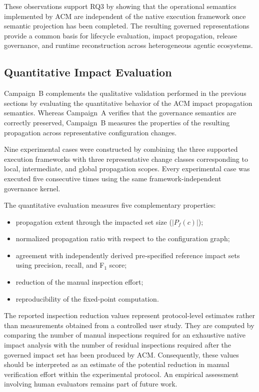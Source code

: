 \documentclass[10pt]{article}
\begin{document}
These observations support RQ3 by showing that the operational semantics implemented by ACM are independent of the native execution framework once semantic projection has been completed. The resulting governed representations provide a common basis for lifecycle evaluation, impact propagation, release governance, and runtime reconstruction across heterogeneous agentic ecosystems.

\subsection{Quantitative Impact Evaluation}
\label{sec:quantitative_impact}

Campaign~B complements the qualitative validation performed in the previous sections by evaluating the quantitative behavior of the ACM impact propagation semantics. Whereas Campaign~A verifies that the governance semantics are correctly preserved, Campaign~B measures the properties of the resulting propagation across representative configuration changes.

Nine experimental cases were constructed by combining the three supported execution frameworks with three representative change classes corresponding to local, intermediate, and global propagation scopes. Every experimental case was executed five consecutive times using the same framework-independent governance kernel.

The quantitative evaluation measures five complementary properties:

\begin{itemize}
	\item propagation extent through the impacted set size ($|P_f(c)|$);
	\item normalized propagation ratio with respect to the configuration graph;
	\item agreement with independently derived pre-specified reference impact sets using precision, recall, and F$_1$ score;
	\item reduction of the manual inspection effort;
	\item reproducibility of the fixed-point computation.
\end{itemize}

The reported inspection reduction values represent protocol-level estimates rather than measurements obtained from a controlled user study. They are computed by comparing the number of manual inspections required for an exhaustive native impact analysis with the number of residual inspections required after the governed impact set has been produced by ACM. Consequently, these values should be interpreted as an estimate of the potential reduction in manual verification effort within the experimental protocol. An empirical assessment involving human evaluators remains part of future work.
\end{document}
